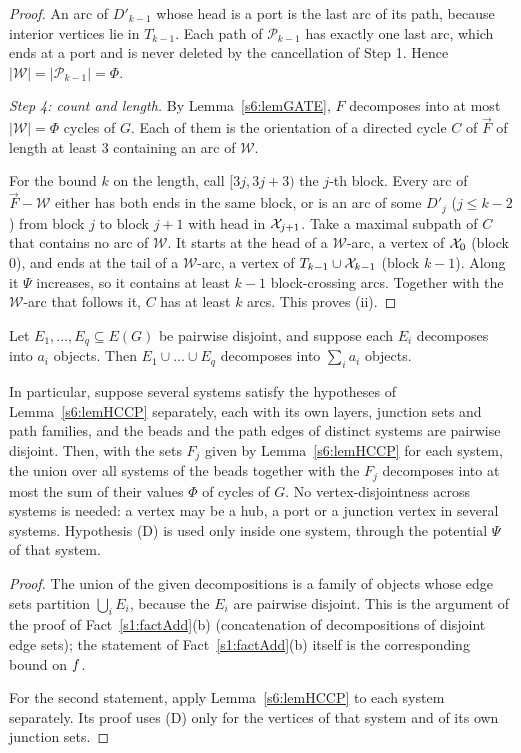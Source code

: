 \begin{proof}
An arc of $D'_{k-1}$ whose head is a port is the last arc of its path, because interior vertices lie in $T_{k-1}$. Each path of $\mathcal P_{k-1}$ has exactly one last arc, which ends at a port and is never deleted by the cancellation of Step 1. Hence $|\mathcal W|=|\mathcal P_{k-1}|=\Phi$.

\emph{Step 4: count and length.} By Lemma~\ref{s6:lemGATE}, $F$ decomposes into at most $|\mathcal W|=\Phi$ cycles of $G$. Each of them is the orientation of a directed cycle $C$ of $\vec F$ of length at least $3$ containing an arc of $\mathcal W$.

For the bound $k$ on the length, call $[3j,3j+3)$ the $j$-th block. Every arc of $\vec F-\mathcal W$ either has both ends in the same block, or is an arc of some $D'_j$ ($j\le k-2$) from block $j$ to block $j+1$ with head in $\mathcal{X}_{j+1}$. Take a maximal subpath of $C$ that contains no arc of $\mathcal W$. It starts at the head of a $\mathcal W$-arc, a vertex of $\mathcal{X}_0$ (block $0$), and ends at the tail of a $\mathcal W$-arc, a vertex of $T_{k-1}\cup\mathcal{X}_{k-1}$ (block $k-1$). Along it $\Psi$ increases, so it contains at least $k-1$ block-crossing arcs. Together with the $\mathcal W$-arc that follows it, $C$ has at least $k$ arcs. This proves (ii).
\end{proof}

\begin{lemma}\label{s6:lemHCCglob}
Let $E_1,\dots,E_q\subseteq E(G)$ be pairwise disjoint, and suppose each $E_i$ decomposes into $a_i$ objects. Then $E_1\cup\dots\cup E_q$ decomposes into $\sum_ia_i$ objects.

In particular, suppose several systems satisfy the hypotheses of Lemma~\ref{s6:lemHCCP} separately, each with its own layers, junction sets and path families, and the beads and the path edges of distinct systems are pairwise disjoint. Then, with the sets $F_j$ given by Lemma~\ref{s6:lemHCCP} for each system, the union over all systems of the beads together with the $F_j$ decomposes into at most the sum of their values $\Phi$ of cycles of $G$. No vertex-disjointness across systems is needed: a vertex may be a hub, a port or a junction vertex in several systems. Hypothesis (D) is used only inside one system, through the potential $\Psi$ of that system.
\deps{\ref{s1:factAdd}, \ref{s6:lemHCCP}}
\end{lemma}

\begin{proof}
The union of the given decompositions is a family of objects whose edge sets partition $\bigcup_iE_i$, because the $E_i$ are pairwise disjoint. This is the argument of the proof of Fact~\ref{s1:factAdd}(b) (concatenation of decompositions of disjoint edge sets); the statement of Fact~\ref{s1:factAdd}(b) itself is the corresponding bound on $f$.

For the second statement, apply Lemma~\ref{s6:lemHCCP} to each system separately. Its proof uses (D) only for the vertices of that system and of its own junction sets.
\end{proof}

